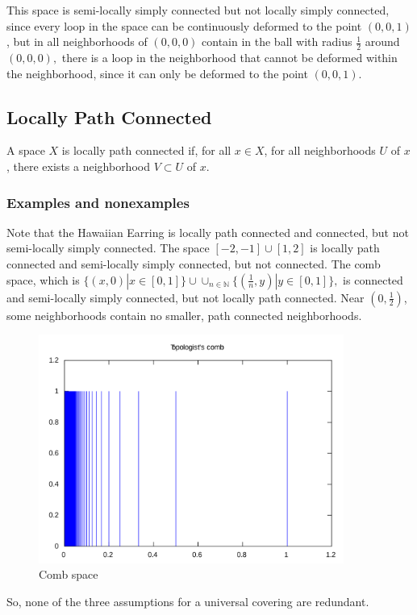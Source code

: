 \documentclass{article}
\theoremstyle{definition}
\begin{document}
This space is semi-locally simply connected but not locally simply connected, since every loop in the space can be continuously deformed to the point $(0, 0, 1)$, but in all neighborhoods of $(0, 0, 0)$ contain in the ball with radius $\frac{1}{2}$ around $(0, 0, 0),$ there is a loop in the neighborhood that cannot be deformed within the neighborhood, since it can only be deformed to the point $(0, 0, 1).$

\subsection{Locally Path Connected}
A space $X$ is locally path connected if, for all $x\in X$, for all neighborhoods $U$ of $x$, there exists a neighborhood $V\subset U$ of $x$.
\subsubsection{Examples and nonexamples}
Note that the Hawaiian Earring is locally path connected and connected, but not semi-locally simply connected. The space $[-2, -1]\cup [1, 2]$ is locally path connected and semi-locally simply connected, but not connected. The comb space, which is $\{(x, 0) |x\in [0, 1]\}\cup \cup_{n\in \mathbb{N}} \{(\frac{1}{n}, y)|y\in [0, 1]\},$ is connected and semi-locally simply connected, but not locally path connected. Near $(0, \frac{1}{2})$, some neighborhoods contain no smaller, path connected neighborhoods.
\begin{figure}[H]
\centering
\includegraphics[width=10cm]{images/m4_comb.png}
\caption{\small{Comb space}}
\label{img:m4_combspace}
\end{figure}
So, none of the three assumptions for a universal covering are redundant.
\end{document}
